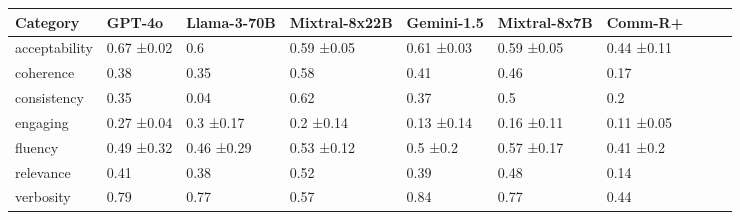 \begin{tabular}{llllllll|cc}
\toprule
Category & GPT-4o & Llama-3-70B & Mixtral-8x22B & Gemini-1.5 & Mixtral-8x7B & Comm-R+ \\
\midrule
acceptability & 0.67 ±0.02 & 0.6 & 0.59 ±0.05 & 0.61 ±0.03 & 0.59 ±0.05 & 0.44 ±0.11 \\
coherence & 0.38  & 0.35  & 0.58  & 0.41  & 0.46  & 0.17  \\
consistency & 0.35  & 0.04  & 0.62  & 0.37  & 0.5  & 0.2  \\
engaging & 0.27 ±0.04 & 0.3 ±0.17 & 0.2 ±0.14 & 0.13 ±0.14 & 0.16 ±0.11 & 0.11 ±0.05 \\
fluency & 0.49 ±0.32 & 0.46 ±0.29 & 0.53 ±0.12 & 0.5 ±0.2 & 0.57 ±0.17 & 0.41 ±0.2 \\
relevance & 0.41  & 0.38  & 0.52  & 0.39  & 0.48  & 0.14  \\
verbosity & 0.79  & 0.77  & 0.57  & 0.84  & 0.77  & 0.44  \\
\bottomrule
\end{tabular}
